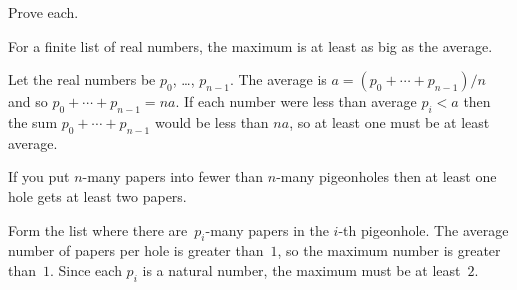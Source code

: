 \documentclass{ibl}  %
\begin{document}
\begin{problem}
\end{problem}

\begin{problem}[\midlength]    Prove each.
\begin{exes}
\begin{exercise} 
  For a finite list of real numbers,
  the maximum is at least as big as the average.
\end{exercise}
\begin{answer}
  Let the real numbers be $p_0$, \ldots, $p_{n-1}$.
  The average is $a=(p_0+\cdots+p_{n-1})/n$ and so 
  $p_0+\cdots+p_{n-1}=na$.
  If each number were less than average $p_i<a$ then the sum
  $p_0+\cdots+p_{n-1}$ would be less than $na$, so at least
  one must be at least average.  
\end{answer}
\begin{exercise} If you put $n$-many papers into fewer than $n$-many
  pigeonholes then at least one hole gets at least two papers.
\end{exercise}
\begin{answer}
  Form the list where there are~$p_i$-many papers in the $i$-th pigeonhole.
  The average number of papers per hole is greater than~$1$, 
  so the maximum number is greater than~$1$.
  Since each $p_i$ is a natural number, the maximum must be at least~$2$.  
\end{answer}
\end{exes}

\end{problem}
\end{document}
